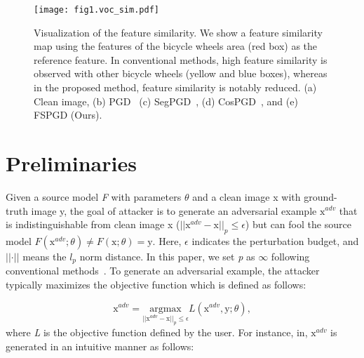 \begin{figure*}
\centering
\texttt{[image: fig1.voc\_sim.pdf]}
\caption{Visualization of the feature similarity. We show a feature similarity map using the features of the bicycle wheels area (red box) as the reference feature. In conventional methods, high feature similarity is observed with other bicycle wheels (yellow and blue boxes), whereas in the proposed method, feature similarity is notably reduced. (a) Clean image, (b) PGD~\cite{mkadry2017towards} (c) SegPGD~\cite{gu2022segpgd}, (d) CosPGD~\cite{agnihotri2024cospgd}, and (e) FSPGD (Ours).}
\label{fig:fig1}
\end{figure*}

\section{Preliminaries}
\label{sec2:preliminaries}
Given a source model \textit{F} with parameters $\theta$ and a clean image x with ground-truth image y, the goal of attacker is to generate an adversarial example $\textrm{x}^{adv}$ that is indistinguishable from clean image x (\ie $\vert\vert \textrm{x}^{adv}-\textrm{x} \vert\vert_{p} \leq \epsilon$) but can fool the source model $F(\textrm{x}^{adv};\theta)\neq F(\textrm{x};\theta)=\textrm{y}$. Here, $\epsilon$ indicates the perturbation budget, and $\vert\vert \cdot \vert\vert$ means the $l_p$ norm distance. In this paper, we set \textit{p} as $\infty$ following conventional methods~\cite{gu2022segpgd, jia2023transegpgd, xie2017adversarial, agnihotri2024cospgd, chen2023rethinking, chen2023adaptive}. To generate an adversarial example, the attacker typically maximizes the objective function which is defined as follows:

\begin{equation}
\label{eq1}
    \textrm{x}^{adv} = \underset{\vert\vert \textrm{x}^{adv}-\textrm{x} \vert\vert_{p} \leq \epsilon}{\mathrm{argmax}}L(\textrm{x}^{adv}, \textrm{y}; \theta),
\end{equation}
where \textit{L} is the objective function defined by the user. For instance, in\cite{goodfellow2014explaining}, $\textrm{x}^{adv}$ is generated in an intuitive manner as follows:

